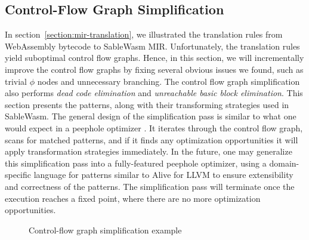 \subsection{Control-Flow Graph Simplification}
\label{section:mir-opt-simplify-cfg}

In section~\ref{section:mir-translation}, we illustrated the translation rules
from WebAssembly bytecode to SableWasm MIR. Unfortunately, the translation rules
yield suboptimal control flow graphs. Hence, in this section, we will
incrementally improve the control flow graphs by fixing several obvious issues
we found, such as trivial $\phi$ nodes and unnecessary branching. The control
flow graph simplification also performs \emph{dead code elimination} and
\emph{unreachable basic block elimination}. This section presents the patterns,
along with their transforming strategies used in SableWasm. The general design
of the simplification pass is similar to what one would expect in a peephole
optimizer \cite{peephole-opt}. It iterates through the control flow graph, scans
for matched patterns, and if it finds any optimization opportunities it will
apply transformation strategies immediately. In the future, one may generalize
this simplification pass into a fully-featured peephole optimizer, using a
domain-specific language for patterns similar to Alive
\cite{alive, alive-in-lean} for LLVM to ensure extensibility and correctness of
the patterns. The simplification pass will terminate once the execution reaches
a fixed point, where there are no more optimization opportunities.

\begin{figure}
    \begin{minipage}[t]{.5\textwidth}
        
    \end{minipage}\hfill
    \begin{minipage}[t]{.5\textwidth}
        
    \end{minipage}
    \caption{Control-flow graph simplification example}
    \label{fig:simplify-example}
\end{figure}

